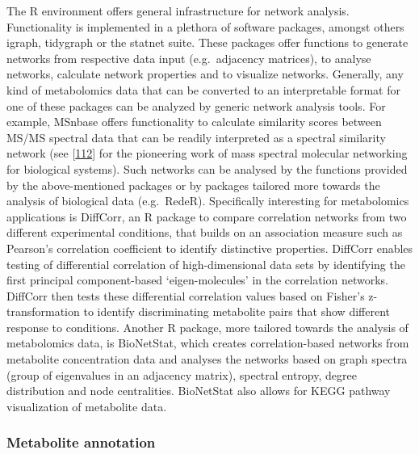 \documentclass[]{article}
\begin{document}
The R environment offers general infrastructure for network analysis. Functionality is implemented in a plethora of software packages, amongst others igraph, tidygraph or the statnet suite. These packages offer functions to generate networks from respective data input (e.g.~adjacency matrices), to analyse networks, calculate network properties and to visualize networks. Generally, any kind of metabolomics data that can be converted to an interpretable format for one of these packages can be analyzed by generic network analysis tools. For example, MSnbase offers functionality to calculate similarity scores between MS/MS spectral data that can be readily interpreted as a spectral similarity network (see {[}\protect\hyperlink{ref-watrous_2012}{112}{]} for the pioneering work of mass spectral molecular networking for biological systems). Such networks can be analysed by the functions provided by the above-mentioned packages or by packages tailored more towards the analysis of biological data (e.g.~RedeR). Specifically interesting for metabolomics applications is DiffCorr, an R package to compare correlation networks from two different experimental conditions, that builds on an association measure such as Pearson's correlation coefficient to identify distinctive properties. DiffCorr enables testing of differential correlation of high-dimensional data sets by identifying the first principal component-based `eigen-molecules' in the correlation networks. DiffCorr then tests these differential correlation values based on Fisher's z-transformation to identify discriminating metabolite pairs that show different response to conditions. Another R package, more tailored towards the analysis of metabolomics data, is BioNetStat, which creates correlation-based networks from metabolite concentration data and analyses the networks based on graph spectra (group of eigenvalues in an adjacency matrix), spectral entropy, degree distribution and node centralities. BioNetStat also allows for KEGG pathway visualization of metabolite data.

\hypertarget{metabolite-annotation}{%
\subsubsection{Metabolite annotation}\label{metabolite-annotation}}
\end{document}
